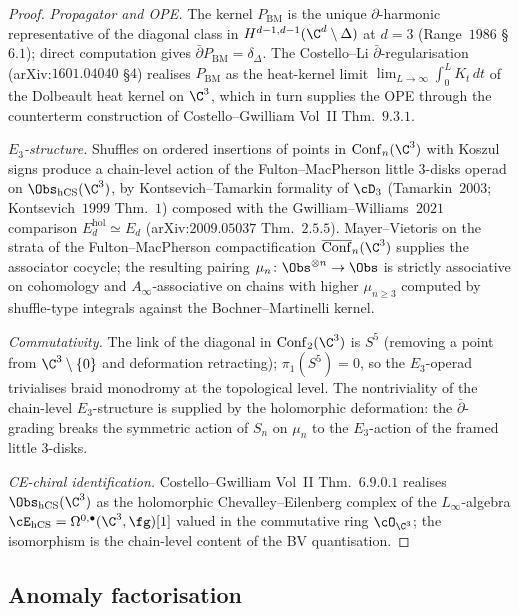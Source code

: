 \begin{proof}
\emph{Propagator and OPE.}
The kernel $P_{\mathrm{BM}}$ is the unique
$\partial$-harmonic representative of the diagonal class in
$H^{d-1, d-1}(\C^d \setminus \Delta)$ at $d = 3$ (Range~$1986$ \S$6.1$);
direct computation gives
$\bar\partial P_{\mathrm{BM}} = \delta_\Delta$. The Costello--Li
$\bar\partial$-regularisation (arXiv:$1601.04040$ \S$4$) realises
$P_{\mathrm{BM}}$ as the heat-kernel limit
$\lim_{L \to \infty} \int_0^L K_t\, dt$ of the Dolbeault heat kernel on $\C^3$,
which in turn supplies the OPE through the counterterm construction of
Costello--Gwilliam Vol~II Thm.~$9.3.1$.

\emph{$E_3$-structure.}
Shuffles on ordered insertions of points in $\mathrm{Conf}_n(\C^3)$ with
Koszul signs produce a chain-level action of the Fulton--MacPherson little
$3$-disks operad on $\Obs_{\hCS}(\C^3)$, by Kontsevich--Tamarkin formality
of $\cD_3$ (Tamarkin~$2003$; Kontsevich~$1999$ Thm.~$1$) composed with the
Gwilliam--Williams~$2021$ comparison $E_d^{\mathrm{hol}} \simeq E_d$
(arXiv:$2009.05037$ Thm.~$2.5.5$).
Mayer--Vietoris on the strata of the Fulton--MacPherson compactification
$\overline{\mathrm{Conf}}_n(\C^3)$ supplies the associator cocycle; the
resulting pairing
$\mu_n \colon \Obs^{\otimes n} \to \Obs$ is strictly associative on
cohomology and $A_\infty$-associative on chains with higher
$\mu_{n \geq 3}$ computed by shuffle-type integrals against the
Bochner--Martinelli kernel.

\emph{Commutativity.}
The link of the diagonal in $\mathrm{Conf}_2(\C^3)$ is $S^5$ (removing
a point from $\C^3 \setminus \{0\}$ and deformation retracting);
$\pi_1(S^5) = 0$, so the $E_3$-operad trivialises braid monodromy at the
topological level. The nontriviality of the chain-level $E_3$-structure
is supplied by the holomorphic deformation: the $\bar\partial$-grading
breaks the symmetric action of $S_n$ on $\mu_n$ to the $E_3$-action of the
framed little $3$-disks.

\emph{CE-chiral identification.}
Costello--Gwilliam Vol~II Thm.~$6.9.0.1$ realises
$\Obs_{\hCS}(\C^3)$ as the holomorphic Chevalley--Eilenberg complex of the
$L_\infty$-algebra $\cE_{\hCS} = \Omega^{0,\bullet}(\C^3, \fg)[1]$ valued
in the commutative ring $\cO_{\C^3}$; the isomorphism is the chain-level
content of the BV quantisation.
\end{proof}

\subsection{Anomaly factorisation}
\label{subsec:hcs-anomaly}

